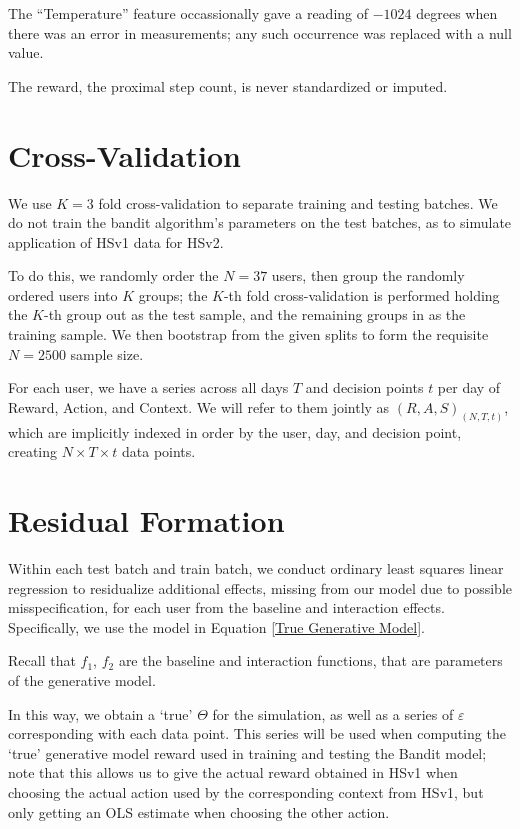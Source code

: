 	The ``Temperature'' feature occassionally gave a reading of $-1024$ degrees when there was an error in measurements; any such occurrence was replaced with a null value.

	The reward, the proximal step count, is never standardized or imputed.



\section{Cross-Validation}

We use $K = 3$ fold cross-validation to separate training and testing batches.  We do not train the bandit algorithm's parameters on the test batches, as to simulate application of HSv1 data for HSv2.  

To do this, we randomly order the $N = 37$ users, then group the randomly ordered users into $K$ groups; the $K$-th fold cross-validation is performed holding the $K$-th group out as the test sample, and the remaining groups in as the training sample.  We then bootstrap from the given splits to form the requisite $N = 2500$ sample size.

For each user, we have a series across all days $T$ and decision points $t$ per day of Reward, Action, and Context.  We will refer to them jointly as $(R, A, S)_{(N,T,t)}$, which are implicitly indexed in order by the user, day, and decision point, creating $N \times T \times t$ data points.  


\section{Residual Formation}
\label{Residual Formation}

Within each test batch and train batch, we conduct ordinary least squares linear regression to residualize additional effects, missing from our model due to possible misspecification, for each user from the baseline and interaction effects.  Specifically, we use the model in Equation \ref{True Generative Model}.

Recall that $f_1$, $f_2$ are the baseline and interaction functions, that are parameters of the generative model.

In this way, we obtain a `true' $\Theta$ for the simulation, as well as a series of $\varepsilon$ corresponding with each data point.  This series will be used when computing the `true' generative model reward used in training and testing the Bandit model; note that this allows us to give the actual reward obtained in HSv1 when choosing the actual action used by the corresponding context from HSv1, but only getting an OLS estimate when choosing the other action.


